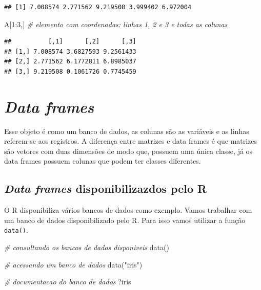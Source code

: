 \documentclass[
]{book}
\newenvironment{Shaded}{\begin{snugshade}}{\end{snugshade}}
\newcommand{\CommentTok}[1]{\textcolor[rgb]{0.56,0.35,0.01}{\textit{#1}}}
\newcommand{\DecValTok}[1]{\textcolor[rgb]{0.00,0.00,0.81}{#1}}
\newcommand{\FunctionTok}[1]{\textcolor[rgb]{0.00,0.00,0.00}{#1}}
\newcommand{\NormalTok}[1]{#1}
\newcommand{\SpecialCharTok}[1]{\textcolor[rgb]{0.00,0.00,0.00}{#1}}
\newcommand{\StringTok}[1]{\textcolor[rgb]{0.31,0.60,0.02}{#1}}
\begin{document}
\begin{verbatim}
## [1] 7.008574 2.771562 9.219508 3.999402 6.972004
\end{verbatim}

\begin{Shaded}
\begin{Highlighting}[]
\NormalTok{A[}\DecValTok{1}\SpecialCharTok{:}\DecValTok{3}\NormalTok{,] }\CommentTok{\# elemento com coordenadas: linhas 1, 2 e 3 e todas as colunas}
\end{Highlighting}
\end{Shaded}

\begin{verbatim}
##          [,1]      [,2]      [,3]
## [1,] 7.008574 3.6827593 9.2561433
## [2,] 2.771562 6.1772811 6.8985037
## [3,] 9.219508 0.1061726 0.7745459
\end{verbatim}

\hypertarget{data-frames}{%
\section{\texorpdfstring{\emph{Data frames}}{Data frames}}\label{data-frames}}

Esse objeto é como um banco de dados, as colunas são as variáveis e as linhas referem-se aos registros. A diferença entre matrizes e data frames é que matrizes são vetores com duas dimensões de modo que, possuem uma única classe, já os data frames possuem colunas que podem ter classes diferentes.

\hypertarget{data-frames-disponibilizazdos-pelo-r}{%
\subsection{\texorpdfstring{\emph{Data frames} disponibilizazdos pelo R}{Data frames disponibilizazdos pelo R}}\label{data-frames-disponibilizazdos-pelo-r}}

O R disponibiliza vários bancos de dados como exemplo. Vamos trabalhar com um banco de dados disponibilizado pelo R. Para isso vamos utilizar a função \texttt{data()}.

\begin{Shaded}
\begin{Highlighting}[]
\CommentTok{\# consultando os bancos de dados disponiveis}
\FunctionTok{data}\NormalTok{()}

\CommentTok{\# acessando um banco de dados}
\FunctionTok{data}\NormalTok{(}\StringTok{"iris"}\NormalTok{)}

\CommentTok{\# documentacao do banco de dados}
\NormalTok{?iris}
\end{Highlighting}
\end{Shaded}
\end{document}
